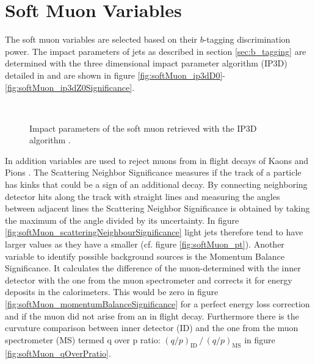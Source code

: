 \section{Soft Muon Variables}
\label{sec:SoftMuonVariables}
The soft muon variables are selected based on their $b$-tagging discrimination power. The impact parameters of jets as described in section \ref{sec:b_tagging} are determined with the three dimensional impact parameter algorithm (IP3D) detailed in \citep{ATL-PHYS-PUB-2017-013} and are shown in figure \ref{fig:softMuon_ip3dD0}-\ref{fig:softMuon_ip3dZ0Significance}.
\begin{figure}[]
  \centering
  \\
  \caption{Impact parameters of the soft muon retrieved with the IP3D algorithm \citep{ATL-PHYS-PUB-2017-013}.}
  \label{fig:softMuonKinematics}
\end{figure}
In addition variables are used to reject muons from in flight decays of Kaons and Pions \citep{ATLAS-CONF-2020-030}. The Scattering Neighbor Significance measures if the track of a particle has kinks that could be a sign of an additional decay. By connecting neighboring detector hits along the track with straight lines and measuring the angles between adjacent lines the Scattering Neighbor Significance is obtained by taking the maximum of the angle divided by its uncertainty. In figure \ref{fig:softMuon_scatteringNeighbourSignificance} light jets therefore tend to have larger values as they have a smaller \pt (cf. figure \ref{fig:softMuon_pt}). Another variable to identify possible background sources is the Momentum Balance Significance. It calculates the difference of the muon-\pt determined with the inner detector with the one from the muon spectrometer and corrects it for energy deposits in the calorimeters. This would be zero in figure \ref{fig:softMuon_momentumBalanceSignificance} for a perfect energy loss correction and if the muon did not arise from an in flight decay. Furthermore there is the curvature comparison between inner detector (ID) and the one from the muon spectrometer (MS) termed q over p ratio: $(q/p)_\mathrm{ID}\, \bm{/}\, (q/p)_\mathrm{MS}$ in figure \ref{fig:softMuon_qOverPratio}.

